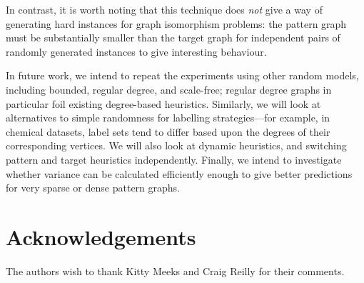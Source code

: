 \documentclass[letterpaper]{article}
\begin{document}
In contrast, it is worth noting that this technique does \emph{not} give a way of generating hard
instances for graph isomorphism problems: the pattern graph must be substantially smaller than the
target graph for independent pairs of randomly generated instances to give interesting behaviour.

In future work, we intend to repeat the experiments using other random models, including bounded,
regular degree, and scale-free; regular degree graphs in particular foil existing degree-based
heuristics. Similarly, we will look at alternatives to simple randomness for labelling
strategies---for example, in chemical datasets, label sets tend to differ based upon the degrees of
their corresponding vertices.  We will also look at dynamic heuristics, and switching pattern and
target heuristics independently.  Finally, we intend to investigate whether variance can be
calculated efficiently enough to give better predictions for very sparse or dense pattern graphs.

\section*{Acknowledgements}

The authors wish to thank Kitty Meeks and Craig Reilly for their comments.



\end{document}
